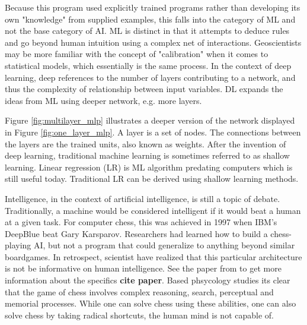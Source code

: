 \documentclass{article}
\begin{document}
Because this program used explicitly trained programs rather than developing its own "knowledge" from supplied examples, this falls into the category of ML and not the base category of AI. ML is distinct in that it attempts to deduce rules and go beyond human intuition using a complex net of interactions. %
Geoscientists may be more familiar with the concept of "calibration" when it comes to statistical models, which essentially is the same process. In the context of deep learning, deep references to the number of layers contributing to a network, and thus the complexity of relationship between input variables. DL expands the ideas from ML using deeper network, e.g. more layers. 

Figure \ref{fig:multilayer_mlp} illustrates a deeper version of the network displayed in Figure \ref{fig:one_layer_mlp}. A layer is a set of nodes. The connections between the layers are the trained units, also known as weights. After the invention of deep learning, traditional machine learning is sometimes referred to as shallow learning. Linear regression (LR) is ML algorithm predating computers which is still useful today. Traditional LR can be derived using shallow learning methods. 

Intelligence, in the context of artificial intelligence, is still a topic of debate. Traditionally, a machine would be considered intelligent if it would beat a human at a given task. For computer chess, this was achieved in 1997 when IBM's DeepBlue beat Gary Karsparov. Researchers had learned how to build a chess-playing AI, but not a program that could generalize to anything beyond %
similar boardgames. In retrospect, scientist have realized that this particular architecture is not be informative on human intelligence. See the paper from to get more information about the specifics \textbf{cite paper}. Based phsycology studies its clear that the game of chess involves complex reasoning, search, perceptual and memorial processes. While one can solve chess using these abilities, one can also solve chess by taking radical shortcuts, the human mind is not capable of. 
\end{document}

